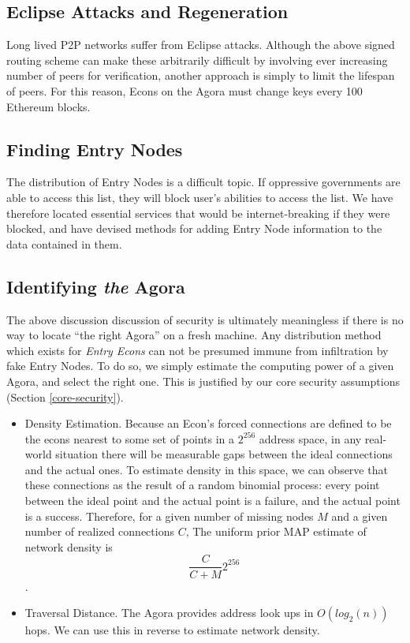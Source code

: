 \subsection{Eclipse Attacks and Regeneration}
\label{agora-regen}

Long lived P2P networks suffer from Eclipse attacks. Although the
above signed routing scheme can make these arbitrarily difficult by
involving ever increasing number of peers for verification, another
approach is simply to limit the lifespan of peers. For this reason,
Econs on the Agora must change keys every 100 Ethereum blocks.



\subsection{Finding Entry Nodes}
\label{bootstrapping}

The distribution of Entry Nodes is a difficult topic. If oppressive governments are able to access this list, they will block user's abilities to access the list. We have therefore located essential services that would be internet-breaking if they were blocked, and have devised methods for adding Entry Node information to the data contained in them.

\subsection{Identifying \emph{the} Agora}

The above discussion discussion of security is ultimately meaningless if there is no way to locate ``the right Agora'' on a fresh machine. Any distribution method which exists for \emph{Entry Econs} can not be presumed immune from infiltration by fake Entry Nodes. To do so, we simply estimate the computing power of a given Agora, and select the right one. This is justified by our core security assumptions (Section \ref{core-security}).

\begin{itemize}
\item Density Estimation. Because an Econ's forced connections are defined to be the econs nearest to some set of points in a $2^{256}$ address space, in any real-world situation there will be measurable gaps between the ideal connections and the actual ones. To estimate density in this space, we can observe that these connections as the result of a random binomial process: every point between the ideal point and the actual point is a failure, and the actual point is a success. Therefore, for a given number of missing nodes $M$ and a given number of realized connections $C$, The uniform prior MAP estimate of network density is $$\frac{C}{C + M} 2^{256}$$.
\item Traversal Distance. The Agora provides address look ups in $O(log_2(n))$ hops. We can use this in reverse to estimate network density.
\end{itemize}

